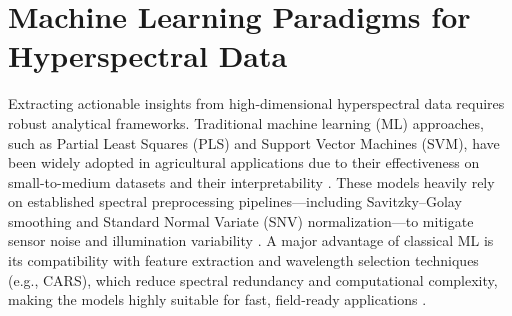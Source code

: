 \section{Machine Learning Paradigms for Hyperspectral Data}
\label{sec:ml_hsi}

\medskip
\noindent
Extracting actionable insights from high-dimensional hyperspectral data requires robust analytical frameworks. Traditional machine learning (ML) approaches, such as Partial Least Squares (PLS) and Support Vector Machines (SVM), have been widely adopted in agricultural applications due to their effectiveness on small-to-medium datasets and their interpretability \parencite{RAM2024109037, su16146064}. These models heavily rely on established spectral preprocessing pipelines---including Savitzky--Golay smoothing and Standard Normal Variate (SNV) normalization---to mitigate sensor noise and illumination variability \parencite{agriculture13051086, horticulturae8070598}. A major advantage of classical ML is its compatibility with feature extraction and wavelength selection techniques (e.g., CARS), which reduce spectral redundancy and computational complexity, making the models highly suitable for fast, field-ready applications \parencite{foods13233956}.



